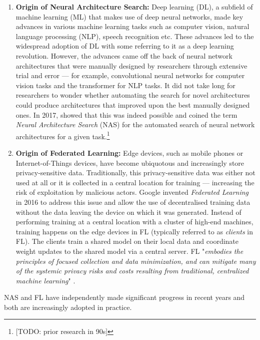 \begin{enumerate}
    \item \textbf{Origin of Neural Architecture Search:} Deep learning (DL), a subfield of machine learning (ML) that makes use of deep neural networks, made key advances in various machine learning tasks such as computer vision, natural language processing (NLP), speech recognition etc. These advances led to the widespread adoption of DL with some referring to it as a deep learning revolution. However, the advances came off the back of neural network architectures that were manually designed by researchers through extensive trial and error — for example, convolutional neural networks for computer vision tasks and the transformer for NLP tasks. It did not take long for researchers to wonder whether automating the search for novel architectures could produce architectures that improved upon the best manually designed ones. In 2017, \cite{nas_with_rl_2017} showed that this was indeed possible and coined the term \textit{Neural Architecture Search} (NAS) for the automated search of neural network architectures for a given task.\footnote{[TODO: prior research in 90s]}
    \item \textbf{Origin of Federated Learning:} Edge devices, such as mobile phones or Internet-of-Things devices, have become ubiquotous and increasingly store privacy-sensitive data. Traditionally, this privacy-sensitive data was either not used at all or it is collected in a central location for training — increasing the risk of exploitation by malicious actors. Google invented \textit{Federated Learning} in 2016 to address this issue and allow the use of decentralised training data without the data leaving the device on which it was generated. Instead of performing training at a central location with a cluster of high-end machines, training happens on the edge devices in FL (typically referred to as \textit{clients} in FL). The clients train a shared model on their local data and coordinate weight updates to the shared model via a central server. FL "\textit{embodies the principles of focused collection and data minimization, and can mitigate many of the systemic privacy risks and costs resulting from traditional, centralized machine learning}" \cite{fl_advances_and_open_problems_2021}.
\end{enumerate}

NAS and FL have independently made significant progress in recent years and both are increasingly adopted in practice.

